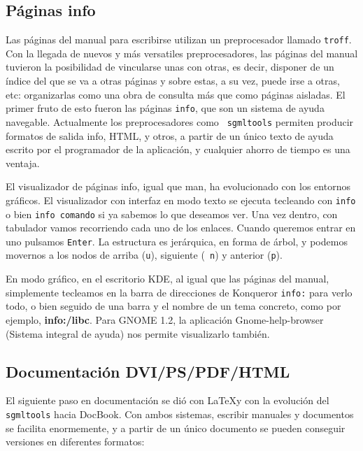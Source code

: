 \subsection{Páginas info}

Las  páginas  del manual  para  escribirse  utilizan un  preprocesador
llamado  {\tt  troff}. Con  la  llegada  de  nuevos y  más  versatiles
preprocesadores,  las páginas  del manual  tuvieron la  posibilidad de
vincularse unas con otras, es decir,  disponer de un índice del que se
va a otras páginas  y sobre estas, a su vez, puede  irse a otras, etc:
organizarlas como una obra de  consulta más que como páginas aisladas.
El primer  fruto de  esto fueron  las páginas {\tt  info}, que  son un
sistema de ayuda navegable.  Actualmente los preprocesadores como {\tt
sgmltools} permiten producir formatos de salida info, HTML, y otros, a
partir de  un único texto  de ayuda escrito  por el programador  de la
aplicación, y cualquier ahorro de tiempo es una ventaja.

El visualizador  de páginas info,  igual que man, ha  evolucionado con
los entornos gráficos.  El visualizador con interfaz en  modo texto se
ejecuta  tecleando con  {\tt info}  o bien  {\tt info  comando} si  ya
sabemos  lo que  deseamos ver.  Una  vez dentro,  con tabulador  vamos
recorriendo cada  uno de  los enlaces. Cuando  queremos entrar  en uno
pulsamos {\tt Enter}. La estructura  es jerárquica, en forma de árbol,
y podemos  movernos a los nodos  de arriba ({\tt u}),  siguiente ({\tt
n}) y anterior ({\tt p}).

En modo gráfico, en el escritorio  {\sf KDE}, al igual que las páginas
del manual, simplemente  tecleamos en la barra de  direcciones de {\sf
Konqueror} {\tt info:} para verlo todo,  o bien seguido de una barra y
el nombre  de un  tema concreto, como  por ejemplo,  {\bf info:/libc}.
Para {\sf GNOME 1.2},  la aplicación {\sf Gnome-help-browser} (Sistema
integral de ayuda) nos permite visualizarlo también.

\subsection{Documentación DVI/PS/PDF/HTML}

El  siguiente  paso en  documentación  se  dió  con  \LaTeX y  con  la
evolución del {\tt sgmltools} hacia {\sf DocBook}. Con ambos sistemas,
escribir manuales y documentos se  facilita enormemente, y a partir de
un  único  documento  se  pueden  conseguir  versiones  en  diferentes
formatos:

